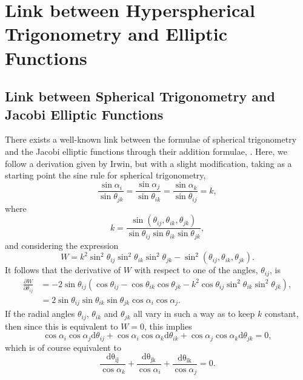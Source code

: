 \documentclass[fleqn,11pt,twoside]{article}
\theoremstyle{definition}
\begin{document}
\section{Link between Hyperspherical Trigonometry and Elliptic Functions}
\subsection{Link between Spherical Trigonometry and Jacobi Elliptic Functions}
There exists a well-known link between the formulae of spherical trigonometry and the Jacobi elliptic functions through their addition formulae, \cite{Lagrange,Legendre}. Here, we follow a derivation given by Irwin\cite{irwin}, but with a slight modification, taking as a starting point the sine rule for spherical trigonometry,
\begin{equation}
\frac{\sin\alpha_i}{\sin\theta_{jk}}=\frac{\sin\alpha_j}{\sin\theta_{ik}}=\frac{\sin\alpha_k}{\sin\theta_{ij}}=k,
\end{equation}
where
\begin{equation}\label{eq:95}
k=\frac{\sin(\theta_{ij},\theta_{ik},\theta_{jk})}{\sin\theta_{ij}\sin\theta_{ik}\sin\theta_{jk}},
\end{equation}
and considering the expression
\begin{equation}
W=k^2\sin^2\theta_{ij}\sin^2\theta_{ik}\sin^2\theta_{jk}-\sin^2(\theta_{ij},\theta_{ik},\theta_{jk}).
\end{equation}
It follows that the derivative of $W$ with respect to one of the angles, $\theta_{ij}$, is
\begin{equation}
\begin{split}
\frac{\partial W}{\partial \theta_{ij}}&=-2\sin\theta_{ij}(\cos\theta_{ij}-\cos\theta_{ik}\cos\theta_{jk}-k^2\cos\theta_{ij}\sin^2\theta_{ik}\sin^2\theta_{jk}),\\
&=2\sin\theta_{ij}\sin\theta_{ik}\sin\theta_{jk}\cos\alpha_i\cos\alpha_j.
\end{split}
\end{equation}
If the radial angles $\theta_{ij}$, $\theta_{ik}$ and $\theta_{jk}$ all vary in such a way as to keep $k$ constant, then since this is equivalent to $W=0$, this implies
\begin{equation}\label{eq:diffrel} 
\cos\alpha_i\cos\alpha_j\mathrm{d}\theta_{ij}+\cos\alpha_i\cos\alpha_k\mathrm{d}\theta_{ik}+\cos\alpha_j\cos\alpha_k\mathrm{d}\theta_{jk}=0,
\end{equation}
which is of course equivalent to
\begin{equation}
\frac{\mathrm{d\theta_{ij}}}{\cos\alpha_k}+\frac{\mathrm{d\theta_{jk}}}{\cos\alpha_i}+\frac{\mathrm{d\theta_{ik}}}{\cos\alpha_j}=0.
\end{equation}
\end{document}
